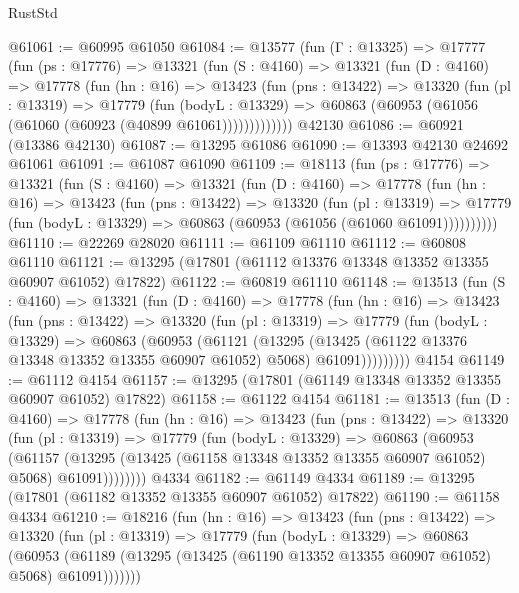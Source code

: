 \begin{lexlean}{RustStd}
\begin{coremodule}
@61061 := @60995 @61050
@61084 := @13577
    (fun (Γ : @13325) =>
    @17777
      (fun (ps : @17776) =>
      @13321
        (fun (S : @4160) =>
        @13321
          (fun (D : @4160) =>
          @17778
            (fun (hn : @16) =>
            @13423
              (fun (pns : @13422) =>
              @13320
                (fun (pl : @13319) =>
                @17779
                  (fun (bodyL : @13329) =>
                  @60863 (@60953 (@61056 (@61060 (@60923 (@40899 @61061)))))))))))))
    @42130
@61086 := @60921 (@13386 @42130)
@61087 := @13295 @61086
@61090 := @13393 @42130 @24692 @61061
@61091 := @61087 @61090
@61109 := @18113
    (fun (ps : @17776) =>
    @13321
      (fun (S : @4160) =>
      @13321
        (fun (D : @4160) =>
        @17778
          (fun (hn : @16) =>
          @13423
            (fun (pns : @13422) =>
            @13320
              (fun (pl : @13319) =>
              @17779 (fun (bodyL : @13329) => @60863 (@60953 (@61056 (@61060 @61091))))))))))
@61110 := @22269 @28020
@61111 := @61109 @61110
@61112 := @60808 @61110
@61121 := @13295 (@17801 (@61112 @13376 @13348 @13352 @13355 @60907 @61052) @17822)
@61122 := @60819 @61110
@61148 := @13513
    (fun (S : @4160) =>
    @13321
      (fun (D : @4160) =>
      @17778
        (fun (hn : @16) =>
        @13423
          (fun (pns : @13422) =>
          @13320
            (fun (pl : @13319) =>
            @17779
              (fun (bodyL : @13329) =>
              @60863
                (@60953
                  (@61121
                    (@13295
                      (@13425 (@61122 @13376 @13348 @13352 @13355 @60907 @61052) @5068)
                      @61091)))))))))
    @4154
@61149 := @61112 @4154
@61157 := @13295 (@17801 (@61149 @13348 @13352 @13355 @60907 @61052) @17822)
@61158 := @61122 @4154
@61181 := @13513
    (fun (D : @4160) =>
    @17778
      (fun (hn : @16) =>
      @13423
        (fun (pns : @13422) =>
        @13320
          (fun (pl : @13319) =>
          @17779
            (fun (bodyL : @13329) =>
            @60863
              (@60953
                (@61157
                  (@13295 (@13425 (@61158 @13348 @13352 @13355 @60907 @61052) @5068) @61091))))))))
    @4334
@61182 := @61149 @4334
@61189 := @13295 (@17801 (@61182 @13352 @13355 @60907 @61052) @17822)
@61190 := @61158 @4334
@61210 := @18216
    (fun (hn : @16) =>
    @13423
      (fun (pns : @13422) =>
      @13320
        (fun (pl : @13319) =>
        @17779
          (fun (bodyL : @13329) =>
          @60863
            (@60953
              (@61189 (@13295 (@13425 (@61190 @13352 @13355 @60907 @61052) @5068) @61091)))))))

\end{coremodule}
\end{lexlean}
